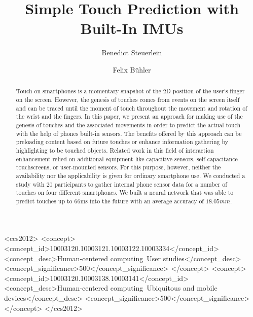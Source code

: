 \documentclass[sigchi-a, authorversion,table]{acmart}
\begin{document}
\title{Simple Touch Prediction with Built-In IMUs}

\author{Benedict Steuerlein}

\author{Felix Bühler}


\renewcommand{\shortauthors}{F. Author et al.}


%
%


\begin{CCSXML}
<ccs2012>
 <concept>
<concept_id>10003120.10003121.10003122.10003334</concept_id>
<concept_desc>Human-centered computing~User studies</concept_desc>
<concept_significance>500</concept_significance>
</concept>
<concept>
<concept_id>10003120.10003138.10003141</concept_id>
<concept_desc>Human-centered computing~Ubiquitous and mobile devices</concept_desc>
<concept_significance>500</concept_significance>
</concept>
</ccs2012>
\end{CCSXML}

\begin{abstract}
Touch on smartphones is a momentary snapshot of the 2D position of the user's finger on the screen. 
However, the genesis of touches comes from events on the screen itself and can be traced until the moment of touch throughout the movement and rotation of the wrist and the fingers.
In this paper, we present an approach for making use of the genesis of touches and the associated movements in order to predict the actual touch with the help of phones built-in sensors.
The benefits offered by this approach can be preloading content based on future touches or enhance information gathering by highlighting to be touched objects.
Related work in this field of interaction enhancement relied on additional equipment like capacitive sensors, self-capacitance touchscreens, or user-mounted sensors.
For this purpose, however, neither the availability nor the applicability is given for ordinary smartphone use.
We conducted a study with 20 participants to gather internal phone sensor data for a number of touches on four different smartphones.
We built a neural network that was able to predict touches up to 66ms into the future with an average accuracy of $ 18.05mm $. 
\end{abstract}
\end{document}

